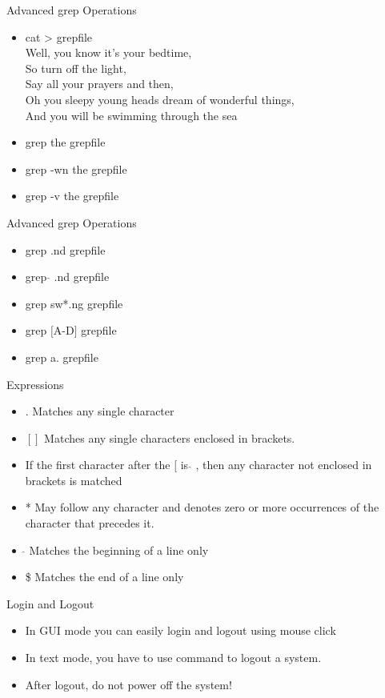 \documentclass{beamer}
\begin{document}
\begin{frame}{Advanced grep Operations}
\begin{itemize}
\item cat > grepfile \\
Well, you know it's your bedtime, \\
So turn off the light, \\
Say all your prayers and then, \\
Oh you sleepy young heads dream of wonderful things, \\
And you will be swimming through the sea \\
\item grep the grepfile
\item grep -wn the grepfile
\item grep -v the grepfile
\end{itemize}
\end{frame}

\begin{frame}{Advanced grep Operations}
\begin{itemize}
\item grep .nd grepfile
\item grep $\hat{}$ .nd grepfile
\item grep sw*.ng grepfile
\item grep $[$A-D$]$ grepfile
\item grep a. grepfile
\end{itemize}
\end{frame}

\begin{frame}{Expressions}
\begin{itemize}
\item .	Matches any single character
\item $[]$ Matches any single characters enclosed in brackets.
\item If the first character after the $[$ is $\hat{}$ , then any character not enclosed in brackets is matched
\item * May follow any character and denotes zero or more occurrences of the character that precedes it.
\item $\hat{}$ Matches the beginning of a line only
\item \$ Matches the end of a line only
\end{itemize}
\end{frame}

\begin{frame}{Login and Logout}
\begin{itemize}
\item In GUI mode you can easily login and logout using mouse click
\item In text mode, you have to use command to logout a system.
\item After logout, do not power off the system!
\end{itemize}
\end{frame}
\end{document}
